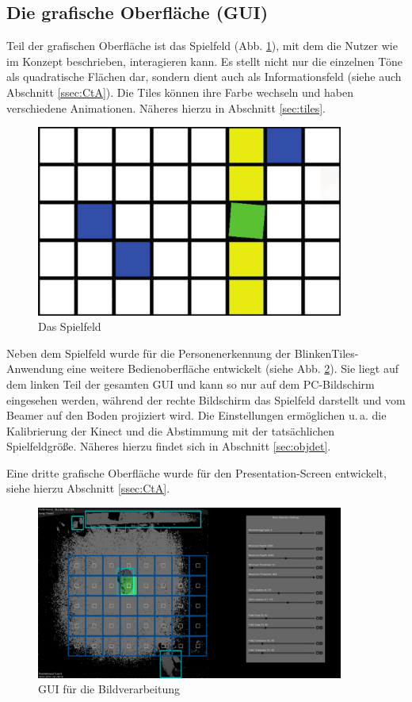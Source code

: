 \subsection{Die grafische Oberfläche (GUI)}

Teil der grafischen Oberfläche ist das Spielfeld (Abb. \ref{fig:gui-tiles}), mit dem die Nutzer wie im Konzept beschrieben, interagieren kann. Es stellt nicht nur die einzelnen Töne als quadratische Flächen dar, sondern dient auch als Informationsfeld (siehe auch Abschnitt \ref{ssec:CtA}). Die Tiles können ihre Farbe wechseln und haben verschiedene Animationen. Näheres hierzu in Abschnitt \ref{sec:tiles}.

\begin{figure}[htbp] 
  \centering
     \includegraphics[width=0.9\textwidth]{images/gui-tiles}
  \caption{Das Spielfeld}
  \label{fig:gui-tiles}
\end{figure}

Neben dem Spielfeld wurde für die Personenerkennung der BlinkenTiles-Anwendung eine weitere Bedienoberfläche entwickelt (siehe Abb. \ref{fig:blob}). Sie liegt auf dem linken Teil der gesamten GUI und kann so nur auf dem PC-Bildschirm eingesehen werden, während der rechte Bildschirm das Spielfeld darstellt und vom Beamer auf den Boden projiziert wird. Die Einstellungen ermöglichen u.\,a.  die Kalibrierung der Kinect und die Abstimmung mit der tatsächlichen Spielfeldgröße. Näheres hierzu findet sich in Abschnitt \ref{sec:objdet}.

Eine dritte grafische Oberfläche wurde für den Presentation-Screen entwickelt, siehe hierzu Abschnitt \ref{ssec:CtA}.

\begin{figure}[htbp] 
  \centering
     \includegraphics[width=0.9\textwidth]{images/Blob}
  \caption{GUI für die Bildverarbeitung}
  \label{fig:blob}
\end{figure}

\newpage
